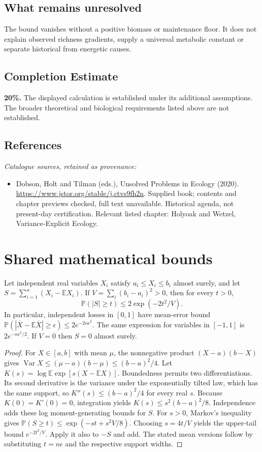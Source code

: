 \documentclass[11pt]{article}
\begin{document}
\subsection{What remains unresolved}
The bound vanishes without a positive biomass or maintenance floor. It does not explain observed richness gradients, supply a universal metabolic constant or separate historical from energetic causes.
\subsection{Completion Estimate}
\textbf{20\%.} The displayed calculation is established under its additional assumptions. The broader theoretical and biological requirements listed above are not established.
\subsection{References}
\noindent\emph{Catalogue sources, retained as provenance:}
\begin{itemize}
\item Dobson, Holt and Tilman (eds.), Unsolved Problems in Ecology (2020). \url{https://www.jstor.org/stable/j.ctvs9fh2n}. Supplied book; contents and chapter previews checked, full text unavailable. Historical agenda, not present-day certification. Relevant listed chapter: Holyoak and Wetzel, Variance-Explicit Ecology.
\end{itemize}




\section{Shared mathematical bounds}\label{app:bounds}
\begin{lemma}\label{lem:bounded}
Let independent real variables $X_i$ satisfy $a_i\leq X_i\leq b_i$ almost surely,
and let $S=\sum_{i=1}^n(X_i-\mathbb{E} X_i)$. If
$V=\sum_i(b_i-a_i)^2>0$, then for every $t>0$,
\[
 \mathbb{P}(|S|\geq t)\leq 2\exp(-2t^2/V).
\]
In particular, independent losses in $[0,1]$ have mean-error bound
$\mathbb{P}(|\overline X-\mathbb{E}\overline X|\geq\epsilon)
\leq2e^{-2n\epsilon^2}$. The same expression for variables in $[-1,1]$
is $2e^{-n\epsilon^2/2}$. If $V=0$ then $S=0$ almost surely.
\end{lemma}
\begin{proof}
For $X\in[a,b]$ with mean $\mu$, the nonnegative product
$(X-a)(b-X)$ gives
$\operatorname{Var} X\leq(\mu-a)(b-\mu)\leq(b-a)^2/4$.
Let $K(s)=\log\mathbb{E}\exp[s(X-\mathbb{E} X)]$.
Boundedness permits two differentiations. Its second derivative is the variance
under the exponentially tilted law, which has the same support, so
$K''(s)\leq(b-a)^2/4$ for every real $s$.
Because $K(0)=K'(0)=0$, integration yields
$K(s)\leq s^2(b-a)^2/8$.
Independence adds these log moment-generating bounds for $S$.
For $s>0$, Markov's inequality gives
$\mathbb{P}(S\geq t)\leq\exp(-st+s^2V/8)$.
Choosing $s=4t/V$ yields the upper-tail bound $e^{-2t^2/V}$.
Apply it also to $-S$ and add. The stated mean versions follow by substituting
$t=n\epsilon$ and the respective support widths.
\end{proof}
\end{document}
